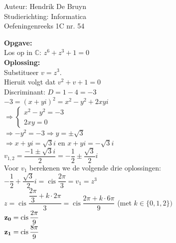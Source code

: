 \documentclass[a4paper]{article}
\newcommand{\cis}{\operatorname{cis}}
\begin{document}
  
\noindent \large Auteur: Hendrik De Bruyn \\
\noindent \large Studierichting: Informatica\\
\noindent \large Oefeningenreeks 1C nr. 54\\

\medskip

\normalsize

\textbf{Opgave:} \\

Los op in $\mathbb{C}$: $z^6 + z^3 + 1 = 0$ \\

\textbf{Oplossing:} \\

Substitueer $v = z^3$. \\

Hieruit volgt dat $v^2 + v + 1 = 0$ \\

Discriminant: $D = 1 - 4 = -3$ \\

$-3 = (x + yi)^2 = x^2 - y^2 + 2xyi$ \\

$\Rightarrow\left\{\begin{array}{l}
    x^2 - y^2 = -3 \\
    2xy = 0
\end{array}\right.$ \\

$\Rightarrow -y^2 = -3 \Rightarrow y = \pm \sqrt{3}$ \\

$\Rightarrow x + yi = \sqrt{3}i$ en $x + yi = -\sqrt{3}i$ \\

$v_{1,2} = \dfrac{-1 \pm \sqrt{3}i}{2} = -\dfrac{1}{2} \pm \dfrac{\sqrt{3}}{2}i$ \\

Voor $v_1$ berekenen we de volgende drie oplossingen: \\

$-\dfrac{1}{2} + \dfrac{\sqrt{3}}{2}i = \cis \dfrac{2\pi}{3} = v_1 = z^3$ \\

$z = \cis \dfrac{\dfrac{2\pi}{3} + k\cdot2\pi}{3} = \cis \dfrac{2\pi + k\cdot6\pi}{9}$ (met $k \in \{0,1,2\})$ \\

${\bf z_0} = \cis \dfrac{2\pi}{9}$ \\

${\bf z_1} = \cis \dfrac{8\pi}{9}$ \\
\end{document}
